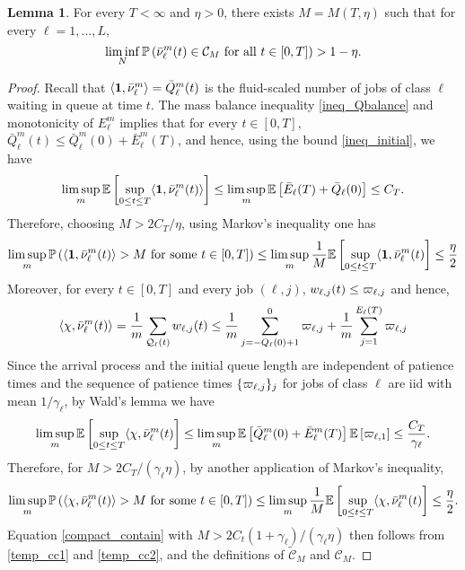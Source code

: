 \documentclass{article}
\theoremstyle{definition}
\newtheorem{lemma}[theorem]{Lemma}
\numberwithin{equation}{section}
\begin{document}
\begin{lemma}\label{lem_nuK1}
  For every $T<\infty$ and $\eta>0$, there exists $M=M(T,\eta)$ such that for every $\ell=1,...,L$,
  \begin{equation}\label{compact_contain}
    \liminf_{N}\mathbb{P}\left(\bar{\nu}_\ell^m(t)\in \mathcal{C}_{M}\text{ for all }t\in[0,T] \right)>1-\eta.
  \end{equation}
\end{lemma}
\begin{proof}
  Recall that $\langle \f1,\bnu^m_\ell\rangle = \bar Q_\ell^m(t)$ is the fluid-scaled number of jobs of class $\ell$ waiting in queue at time $t$. The mass balance inequality \eqref{ineq_Qbalance} and monotonicity of $E^m_\ell$ implies that for every $t\in[0,T]$, $\bar Q_\ell^m(t)\leq \bar Q_\ell^m(0)+ \bar E^m_\ell(T)$, and hence, using the bound \eqref{ineq_initial}, we have
  \[
  \limsup_{m}\Ept{\sup_{0\leq t\leq T}\langle\f1,\bnu^m_\ell(t)\rangle}\leq \limsup_{m}\Ept{\bar\arrival_\ell(T)+ \bql_\ell(0)}\leq C_T.
  \]
  Therefore, choosing $M>2C_T/\eta$, using Markov's inequality one has
  \begin{equation}\label{temp_cc1}
    \limsup_m\Prob{\langle\f1,\bnu^m_\ell(t)\rangle >M \text{ for some }t\in[0,T] }\leq \limsup_m \frac{1}{M}\Ept{\sup_{0\leq t\leq T}\langle\f1,\bnu^m_\ell(t)}\leq \frac{\eta}{2}
  \end{equation}
  Moreover, for every  $t\in[0,T]$ and every job $(\ell,j)$,  $w_{\ell,j}(t)\leq \varpi_{\ell,j}$  and hence,
  \[
  \langle\chi,\bar{\nu}_\ell^m(t)\rangle =\frac{1}{m}\sum_{\mathcal{Q}_\ell(t)}w_{\ell,j}(t) \leq \frac{1}{m}\sum_{j=-Q_\ell(0)+1}^{0}\varpi_{\ell,j}+\frac{1}{m}\sum_{j=1}^{E_\ell(T)} \varpi_{\ell,j}
  \]
  Since the arrival process and the initial queue length are independent of patience times and the sequence of patience times $\{\varpi_{\ell,j}\}_j$ for jobs of class $\ell$ are iid with mean $1/\gamma_\ell$,  by Wald's lemma \cite[Proposition A.10.2]{Asm03} we have
  \[\limsup_{m}\mathbb{E}\left[\sup_{0\leq t\leq T}\langle\chi,\bar{\nu}^m_\ell(t)\right]\leq  \limsup_m \mathbb{E}\left[\bar {Q}^m_\ell(0)+\bar{E}^m_\ell(T)\right] \mathbb{E}\left[\varpi_{\ell,1}\right]\leq \frac{C_T}{\gamma_\ell}.\]
  Therefore, for $M>2C_T/(\gamma_\ell\eta)$, by another application of Markov's inequality,
  \begin{equation}\label{temp_cc2}
  \limsup_m\mathbb{P}\left(\langle\chi,\bar{\nu}^m_\ell(t)\rangle >M \text{ for some }t\in[0,T] \right)\leq \limsup_m \frac{1}{M}\mathbb{E}\left[\sup_{0\leq t\leq T}\langle\chi,\bar{\nu}^m_\ell(t)\right]\leq \frac{\eta}{2}.
  \end{equation}
  Equation \eqref{compact_contain} with $M>2C_t(1+\gamma_\ell)/(\gamma_\ell\eta)$ then follows from \eqref{temp_cc1} and \eqref{temp_cc2}, and the definitions of $\tilde{\mathcal{C}}_M$ and $\mathcal{C}_M$.
\end{proof}
\end{document}
